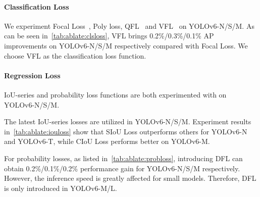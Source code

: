 \documentclass[10pt,twocolumn,letterpaper]{article}
\begin{document}
\paragraph{Classification Loss} We experiment Focal Loss~\cite{lin2017focal}, Poly loss\cite{leng2022polyloss}, QFL~\cite{li2020generalized} and VFL~\cite{zhang2021varifocalnet} on YOLOv6-N/S/M. As can be seen in~\cref{tab:ablate:clsloss}, VFL brings 0.2\%/0.3\%/0.1\% AP improvements on YOLOv6-N/S/M respectively compared with Focal Loss. We choose VFL as the classification loss function.

\paragraph{Regression Loss} IoU-series and probability loss functions are both experimented with on YOLOv6-N/S/M.

The latest IoU-series losses are utilized in YOLOv6-N/S/M. Experiment results in~\cref{tab:ablate:iouloss} show that SIoU Loss outperforms others for YOLOv6-N and YOLOv6-T, while CIoU Loss performs better on YOLOv6-M.

For probability losses, as listed in~\cref{tab:ablate:probloss}, introducing DFL can obtain 0.2\%/0.1\%/0.2\% performance gain for YOLOv6-N/S/M respectively. However, the inference speed is greatly affected for small models. Therefore, DFL is only introduced in YOLOv6-M/L.

\begin{table}[ht]
  \centering
\caption{Ablation study on IoU-series box regression loss functions. The classification loss is VFL~\cite{zhang2021varifocalnet}.}
\label{tab:ablate:iouloss}
\end{table}
\end{document}
